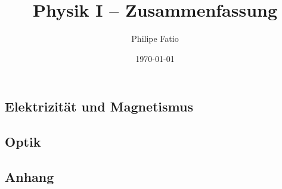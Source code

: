 \documentclass[9pt,fleqn,article,ngerman]{memoir}
\title{Physik I -- Zusammenfassung}
\date{\today}
\author{Philipe Fatio}
\numberwithin{equation}{section}
\begin{document}
\begin{multicols*}{3}
	\chapter{Elektrizität und Magnetismus} %
\end{multicols*}
\begin{multicols*}{3}
	\chapter{Optik} %
\end{multicols*}

\appendix
\begin{multicols*}{3}
	\chapter{Anhang}
\end{multicols*}
\end{document}
